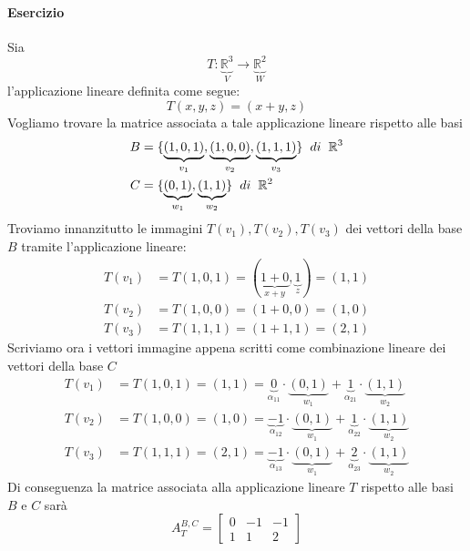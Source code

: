 \documentclass[a4paper, 10pt]{article}
\begin{document}
	\paragraph*{Esercizio}
	Sia \[T : \underbrace{\mathbb{R}^3}_{V} \rightarrow \underbrace{\mathbb{R}^2}_{W} \] l'applicazione lineare 
	definita come segue: \[ T(x,y,z) = (x + y , z)\]Vogliamo trovare la matrice associata a tale applicazione lineare 
	rispetto alle basi
	\begin{equation*}
		\begin{split}
			B &= \lbrace \underbrace{(1,0,1)}_{v_1} , \underbrace{(1,0,0)}_{v_2} , \underbrace{(1,1,1)}_{v_3} 
			\rbrace \hspace{0.2cm} di \hspace{0.2cm} \mathbb{R}^3 \\  			
			C &= \lbrace \underbrace{(0,1)}_{w_1}, \underbrace{(1,1)}_{w_2} \rbrace \hspace{0.2cm} di \hspace{0.2cm}
			\mathbb{R}^2
		\end{split}
	\end{equation*}
	Troviamo innanzitutto le immagini $T(v_1), T(v_2), T(v_3)$ dei vettori della base $B$ tramite l'applicazione lineare:
	\begin{equation*}
		\begin{split}
			T(v_1) &= T(1,0,1) = (\underbrace{1 + 0}_{x + y},\underbrace{1}_{z}) = (1,1)\\
			T(v_2) &= T(1,0,0) = (1 + 0,0) = (1,0)\\
			T(v_3) &= T(1,1,1) = (1 + 1, 1) = (2,1)
		\end{split}
	\end{equation*}
	Scriviamo ora i vettori immagine appena scritti come combinazione lineare dei vettori della base $C$
	\begin{equation*}
		\begin{split}
			T(v_1) &= T(1,0,1) = (1,1) = \underbrace{0}_{\alpha_{11}} \cdot \underbrace{(0,1)}_{w_1} + 
			\underbrace{1}_{\alpha_{21}} \cdot \underbrace{(1,1)}_{w_2} \\
			T(v_2) &= T(1,0,0) = (1,0) = \underbrace{-1}_{\alpha_{12}} \cdot \underbrace{(0,1)}_{w_1} + 
			\underbrace{1}_{\alpha_{22}} \cdot \underbrace{(1,1)}_{w_2} \\
			T(v_3) &= T(1,1,1) = (2,1) = \underbrace{-1}_{\alpha_{13}} \cdot \underbrace{(0,1)}_{w_1} + 
			\underbrace{2}_{\alpha_{23}} \cdot \underbrace{(1,1)}_{w_2} 
		\end{split}
	\end{equation*}
	Di conseguenza la matrice associata alla applicazione lineare $T$ rispetto alle basi $B$ e $C$ sarà
	\[ A_T ^{B,C} = \begin{bmatrix} 0 & -1 & -1 \\ 1 & 1 & 2 \end{bmatrix} \]
	
\end{document}
